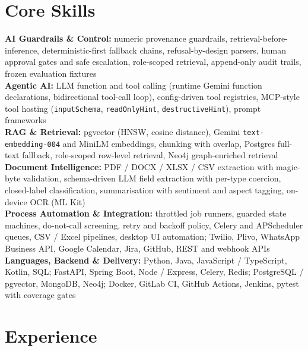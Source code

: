 \documentclass[10pt,a4paper]{article}
\begin{document}
\section{Core Skills}
\textbf{AI Guardrails \& Control:} numeric provenance guardrails, retrieval-before-inference,
deterministic-first fallback chains, refusal-by-design parsers, human approval gates and safe
escalation, role-scoped retrieval, append-only audit trails, frozen evaluation fixtures\\
\textbf{Agentic AI:} LLM function and tool calling (runtime Gemini function declarations,
bidirectional tool-call loop), config-driven tool registries, MCP-style tool hosting
(\texttt{inputSchema}, \texttt{readOnlyHint}, \texttt{destructiveHint}), prompt frameworks\\
\textbf{RAG \& Retrieval:} pgvector (HNSW, cosine distance), Gemini \texttt{text-embedding-004} and
MiniLM embeddings, chunking with overlap, Postgres full-text fallback, role-scoped row-level
retrieval, Neo4j graph-enriched retrieval\\
\textbf{Document Intelligence:} PDF / DOCX / XLSX / CSV extraction with magic-byte validation,
schema-driven LLM field extraction with per-type coercion, closed-label classification,
summarisation with sentiment and aspect tagging, on-device OCR (ML Kit)\\
\textbf{Process Automation \& Integration:} throttled job runners, guarded state machines,
do-not-call screening, retry and backoff policy, Celery and APScheduler queues, CSV / Excel
pipelines, desktop UI automation; Twilio, Plivo, WhatsApp Business API, Google Calendar, Jira,
GitHub, REST and webhook APIs\\
\textbf{Languages, Backend \& Delivery:} Python, Java, JavaScript / TypeScript, Kotlin, SQL; FastAPI,
Spring Boot, Node / Express, Celery, Redis; PostgreSQL / pgvector, MongoDB, Neo4j; Docker, GitLab CI,
GitHub Actions, Jenkins, pytest with coverage gates

\section{Experience}
\end{document}
